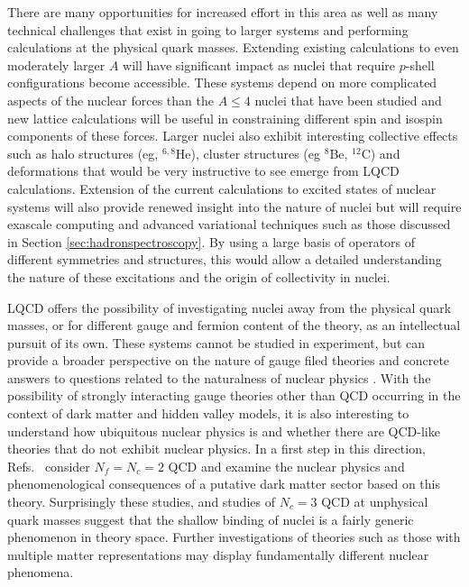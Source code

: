 There are many opportunities for increased effort in this area as well as many technical challenges that exist in going to larger systems and performing calculations at the physical quark masses. 
Extending existing calculations to even moderately larger $A$ will have significant impact as nuclei that require $p$-shell configurations become accessible. These systems depend on more complicated aspects of the nuclear forces than the $A\le4$ nuclei that have been studied and new lattice calculations will be useful in constraining different spin and isospin components of these forces. Larger nuclei also exhibit interesting collective effects such as halo structures (eg,  ${}^{6,8}$He), cluster structures (eg ${}^{8}$Be, ${}^{12}$C) and deformations that would be very instructive to see emerge from LQCD calculations.  Extension of the current calculations to excited states of nuclear systems will also provide renewed insight into the nature of nuclei but will require exascale computing and advanced variational techniques such as those discussed in Section \ref{sec:hadronspectroscopy}.
By using a large basis of operators of different symmetries and structures, this would allow a detailed understanding the nature of these excitations and the origin of collectivity in nuclei. 

LQCD offers the possibility of investigating nuclei away from the physical quark masses, or for different gauge and fermion content of the theory, as an intellectual pursuit of its own. These systems cannot be studied in experiment, but can provide a broader perspective on the nature of gauge filed theories and concrete answers to questions related to the naturalness of nuclear physics \cite{Orginos:2015aya,Epelbaum:2012iu,Berengut:2013nh,CarrilloSerrano:2012ja}. With the  possibility of strongly interacting gauge theories other than QCD occurring in the context of dark matter and hidden valley models, it is also interesting to understand how ubiquitous nuclear physics is and whether there are QCD-like theories that do not exhibit nuclear physics.  In a first step in this direction,  Refs.~\cite{Detmold:2014qqa,Detmold:2014kba}  consider $N_f=N_c=2$ QCD and examine the nuclear physics and phenomenological consequences of  a putative dark matter sector based on this theory. Surprisingly these studies, and studies of $N_c=3$ QCD at unphysical quark masses suggest that the shallow binding of nuclei is a fairly generic phenomenon in theory space. Further investigations of theories such as those with multiple matter representations \cite{Niel} may display fundamentally different nuclear phenomena.



